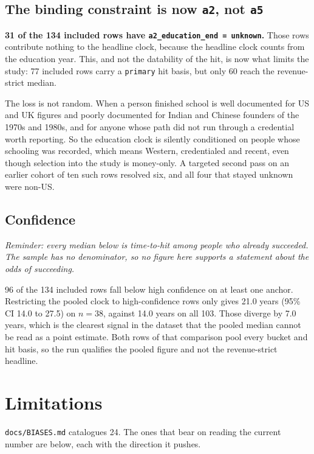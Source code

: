 \documentclass[11pt]{article}
\newcommand{\caveat}{\emph{\small Reminder: every median below is time-to-hit
among people who already succeeded. The sample has no denominator, so no figure
here supports a statement about the odds of succeeding.}\par\medskip}
\begin{document}
\subsection{The binding constraint is now \texttt{a2}, not \texttt{a5}}

\textbf{31 of the 134 included rows have
\texttt{a2\_education\_end = unknown}.} Those rows contribute nothing to the
headline clock, because the headline clock counts from the education year.
This, and not the datability of the hit, is now what limits the study: 77
included rows carry a \texttt{primary} hit basis, but only 60 reach the
revenue-strict median.

The loss is not random. When a person finished school is well documented for US
and UK figures and poorly documented for Indian and Chinese founders of the
1970s and 1980s, and for anyone whose path did not run through a credential
worth reporting. So the education clock is silently conditioned on people whose
schooling was recorded, which means Western, credentialed and recent, even
though selection into the study is money-only. A targeted second pass on an
earlier cohort of ten such rows resolved six, and all four that stayed unknown
were non-US.

\subsection{Confidence}

\caveat

96 of the 134 included rows fall below high confidence on at least one anchor.
Restricting the pooled clock to high-confidence rows only gives 21.0 years (95\%
CI 14.0 to 27.5) on $n = 38$, against 14.0 years on all 103. Those diverge by
7.0 years, which is the clearest signal in the dataset that the pooled median
cannot be read as a point estimate. Both rows of that comparison pool every
bucket and hit basis, so the run qualifies the pooled figure and not the
revenue-strict headline.

\section{Limitations}
\label{sec:limits}

\texttt{docs/BIASES.md} catalogues 24. The ones that bear on reading the
current number are below, each with the direction it pushes.
\end{document}
